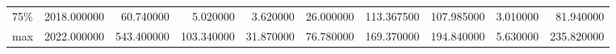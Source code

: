 \begin{tabular}{lrrrrrrrrr}
75\%   &  2018.000000 &                       60.740000 &                                           5.020000 &                              3.620000 &                               26.000000 &                                 113.367500 &                                107.985000 &                          3.010000 &             81.940000 \\
max   &  2022.000000 &                      543.400000 &                                         103.340000 &                             31.870000 &                               76.780000 &                                 169.370000 &                                194.840000 &                          5.630000 &            235.820000 \\
\bottomrule
\end{tabular}
